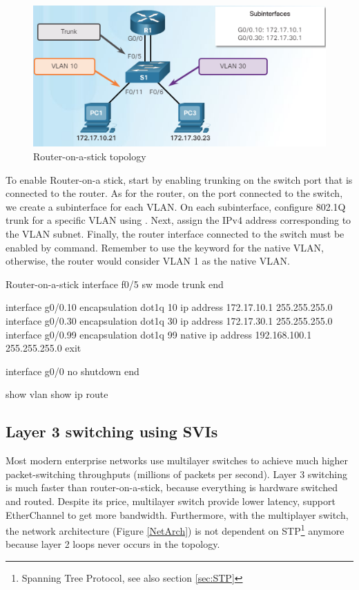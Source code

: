 \begin{figure}[hbtp]
\caption{Router-on-a-stick topology}\label{InterVLAN}
\centering
\includegraphics[scale=0.7]{pictures/InterVLAN.PNG}
\end{figure}


To enable Router-on-a stick, start by enabling trunking on the switch port that is connected to the router. As for the router, on the port connected to the switch, we create a subinterface for each VLAN. On each subinterface, configure 802.1Q trunk for a specific VLAN using . Next, assign the IPv4 address corresponding to the VLAN subnet. Finally, the router interface connected to the switch must be enabled by  command. Remember to use the  keyword for the native VLAN, otherwise, the router would consider VLAN 1 as the native VLAN.

\begin{sexylisting}{Router-on-a-stick}
interface f0/5
  sw mode trunk
end

interface g0/0.10
  encapsulation dot1q 10
  ip address 172.17.10.1 255.255.255.0
interface g0/0.30
  encapsulation dot1q 30
  ip address 172.17.30.1 255.255.255.0
interface g0/0.99
  encapsulation dot1q 99 native
  ip address 192.168.100.1 255.255.255.0  
exit

interface g0/0
  no shutdown
end

show vlan
show ip route  
\end{sexylisting}

\subsection{Layer 3 switching using SVIs}

Most modern enterprise networks use multilayer switches to achieve much higher packet-switching throughputs (millions of packets per second). Layer 3 switching is much faster than router-on-a-stick, because everything is hardware switched and routed. Despite its price, multilayer switch provide lower latency, support EtherChannel to get more bandwidth. Furthermore, with the multiplayer switch, the network architecture (Figure \ref{NetArch}) is not dependent on STP\footnote{Spanning Tree Protocol, see also section \ref{sec:STP} } anymore because layer 2 loops never occurs in the topology.

